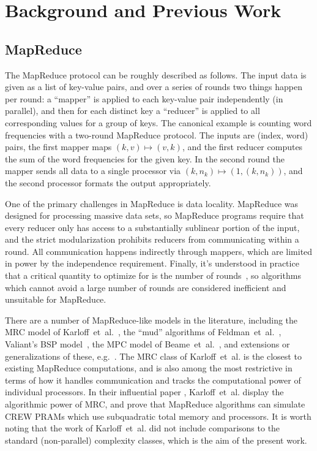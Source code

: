\documentclass{llncs}
\begin{document}
\section{Background and Previous Work}

\subsection{MapReduce}

The MapReduce protocol can be roughly described as follows. The input data is
given as a list of key-value pairs, and over a series of rounds two things
happen per round: a ``mapper'' is applied to each key-value pair independently
(in parallel), and then for each distinct key a ``reducer'' is applied to all
corresponding values for a group of keys. The canonical example is counting
word frequencies with a two-round MapReduce protocol. The inputs are (index,
word) pairs, the first mapper maps $(k,v) \mapsto (v,k)$, and the first reducer
computes the sum of the word frequencies for the given key. In the second round
the mapper sends all data to a single processor via $(k, n_k) \mapsto (1, (k,
n_k))$, and the second processor formats the output appropriately.

One of the primary challenges in MapReduce is data locality. MapReduce was
designed for processing massive data sets, so MapReduce programs require that
every reducer only has access to a substantially sublinear portion of the
input, and the strict modularization prohibits reducers from communicating
within a round. All communication happens indirectly through mappers, which are
limited in power by the independence requirement. Finally, it's understood in
practice that a critical quantity to optimize for is the number of
rounds~\cite{Karloff10}, so algorithms which cannot avoid a large number of
rounds are considered inefficient and unsuitable for MapReduce.

There are a number of MapReduce-like models in the literature, including the
MRC model of Karloff~et~al.~\cite{Karloff10}, the ``mud'' algorithms of
Feldman~et~al.~\cite{FeldmanMSSS10}, Valiant's BSP model~\cite{Valiant90}, the
MPC model of Beame~et~al.~\cite{BeameKS13}, and extensions or generalizations
of these, e.g.~\cite{GoodrichSZ11}. The MRC class of Karloff~et~al. is the
closest to existing MapReduce computations, and is also among the most
restrictive in terms of how it handles communication and tracks the
computational power of individual processors. In their influential paper
\cite{Karloff10}, Karloff~et~al. display the algorithmic power of MRC, and
prove that MapReduce algorithms can simulate CREW PRAMs which use subquadratic
total memory and processors. It is worth noting that the work of Karloff~et~al.
did not include comparisons to the standard (non-parallel) complexity classes,
which is the aim of the present work.
\end{document}
